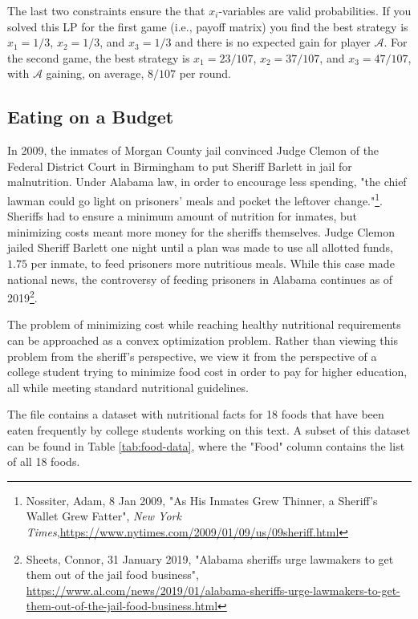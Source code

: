The last two constraints ensure the that $x_i$-variables are valid probabilities. If you solved this LP for the first game (i.e., payoff matrix) you find the best strategy is $x_1 = 1/3$, $x_2 = 1/3$, and $x_3 = 1/3$ and there is no expected gain for player $\mathcal{A}$.  For the second game, the best strategy is $x_1 = 23/107$, $x_2 = 37/107$, and $x_3 = 47/107$, with $\mathcal{A}$ gaining, on average, $8/107$ per round.

\subsection*{Eating on a Budget}

In 2009, the inmates of Morgan County jail convinced Judge Clemon of the Federal District Court in Birmingham to put Sheriff Barlett in jail for malnutrition.
Under Alabama law, in order to encourage less spending, "the chief lawman could go light on prisoners' meals and pocket the leftover change."\footnote[1]{Nossiter, Adam, 8 Jan 2009, "As His Inmates Grew Thinner, a Sheriff’s Wallet Grew Fatter", \emph{New York Times},\url{https://www.nytimes.com/2009/01/09/us/09sheriff.html}}.
Sheriffs had to ensure a minimum amount of nutrition for inmates, but minimizing costs meant more money for the sheriffs themselves.
Judge Clemon jailed Sheriff Barlett one night until a plan was made to use all allotted funds, $1.75$ per inmate, to feed prisoners more nutritious meals.
While this case made national news, the controversy of feeding prisoners in Alabama continues as of 2019\footnote[2]{Sheets, Connor, 31 January 2019, "Alabama sheriffs urge lawmakers to get them out of the jail food business", \url{https://www.al.com/news/2019/01/alabama-sheriffs-urge-lawmakers-to-get-them-out-of-the-jail-food-business.html}}.

The problem of minimizing cost while reaching healthy nutritional requirements can be approached as a convex optimization problem.
Rather than viewing this problem from the sheriff's perspective, we view it from the perspective of a college student trying to minimize food cost in order to pay for higher education, all while meeting standard nutritional guidelines.

The file  contains a dataset with nutritional facts for 18 foods that have been eaten frequently by college students working on this text.
A subset of this dataset can be found in Table \ref{tab:food-data}, where the "Food" column contains the list of all 18 foods.

